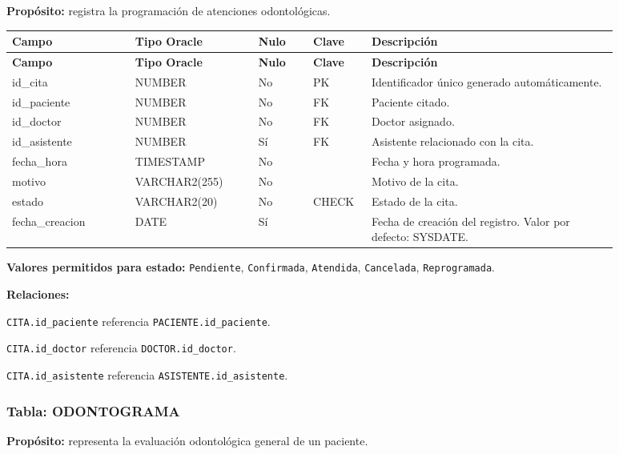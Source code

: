 \textbf{Propósito:} registra la programación de atenciones odontológicas.\par

\begin{longtable}{p{0.18\linewidth}p{0.18\linewidth}p{0.08\linewidth}p{0.08\linewidth}p{0.36\linewidth}}
\toprule
\textbf{Campo} & \textbf{Tipo Oracle} & \textbf{Nulo} & \textbf{Clave} & \textbf{Descripción} \\
\midrule
\endfirsthead
\toprule
\textbf{Campo} & \textbf{Tipo Oracle} & \textbf{Nulo} & \textbf{Clave} & \textbf{Descripción} \\
\midrule
\endhead
id\_cita & NUMBER & No & PK & Identificador único generado automáticamente. \\
id\_paciente & NUMBER & No & FK & Paciente citado. \\
id\_doctor & NUMBER & No & FK & Doctor asignado. \\
id\_asistente & NUMBER & Sí & FK & Asistente relacionado con la cita. \\
fecha\_hora & TIMESTAMP & No &  & Fecha y hora programada. \\
motivo & VARCHAR2(255) & No &  & Motivo de la cita. \\
estado & VARCHAR2(20) & No & CHECK & Estado de la cita. \\
fecha\_creacion & DATE & Sí &  & Fecha de creación del registro. Valor por defecto: SYSDATE. \\
\bottomrule
\end{longtable}

\textbf{Valores permitidos para estado:} \texttt{Pendiente}, \texttt{Confirmada}, \texttt{Atendida}, \texttt{Cancelada}, \texttt{Reprogramada}.\par

\textbf{Relaciones:}\par
\texttt{CITA.id\_paciente} referencia \texttt{PACIENTE.id\_paciente}.\par
\texttt{CITA.id\_doctor} referencia \texttt{DOCTOR.id\_doctor}.\par
\texttt{CITA.id\_asistente} referencia \texttt{ASISTENTE.id\_asistente}.\par



\subsubsection{Tabla: ODONTOGRAMA}

\textbf{Propósito:} representa la evaluación odontológica general de un paciente.\par


